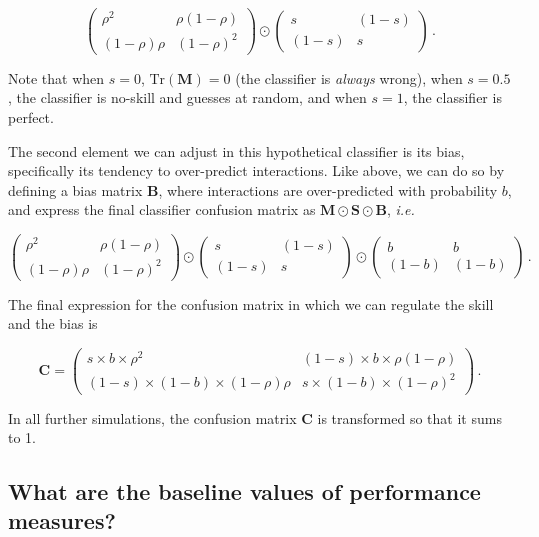 \documentclass[10pt,oneside]{article}
\begin{document}
\[
\begin{pmatrix}
    \rho^2 & \rho (1-\rho) \\
    (1-\rho) \rho & (1-\rho)^2
\end{pmatrix} \odot \begin{pmatrix}
    s & (1-s) \\
    (1-s) & s
\end{pmatrix} \,.
\]

Note that when \(s=0\), \(\text{Tr}(\mathbf{M}) = 0\) (the classifier is
\emph{always} wrong), when \(s=0.5\), the classifier is no-skill and
guesses at random, and when \(s=1\), the classifier is perfect.

The second element we can adjust in this hypothetical classifier is its
bias, specifically its tendency to over-predict interactions. Like
above, we can do so by defining a bias matrix \(\mathbf{B}\), where
interactions are over-predicted with probability \(b\), and express the
final classifier confusion matrix as
\(\mathbf{M}\odot \mathbf{S}\odot \mathbf{B}\), \emph{i.e.}

\[
\begin{pmatrix}
    \rho^2 & \rho (1-\rho) \\
    (1-\rho) \rho & (1-\rho)^2
\end{pmatrix} \odot \begin{pmatrix}
    s & (1-s) \\
    (1-s) & s
\end{pmatrix} \odot \begin{pmatrix}
    b & b \\
    (1-b) & (1-b)
\end{pmatrix}\,.
\]

The final expression for the confusion matrix in which we can regulate
the skill and the bias is

\[
\mathbf{C} = \begin{pmatrix}
    s\times b\times \rho^2 & (1-s)\times b\times \rho (1-\rho) \\
    (1-s)\times (1-b)\times (1-\rho) \rho & s\times (1-b)\times (1-\rho)^2
\end{pmatrix} \,.
\]

In all further simulations, the confusion matrix \(\mathbf{C}\) is
transformed so that it sums to 1.

\hypertarget{what-are-the-baseline-values-of-performance-measures}{%
\subsection{What are the baseline values of performance
measures?}\label{what-are-the-baseline-values-of-performance-measures}}
\end{document}
